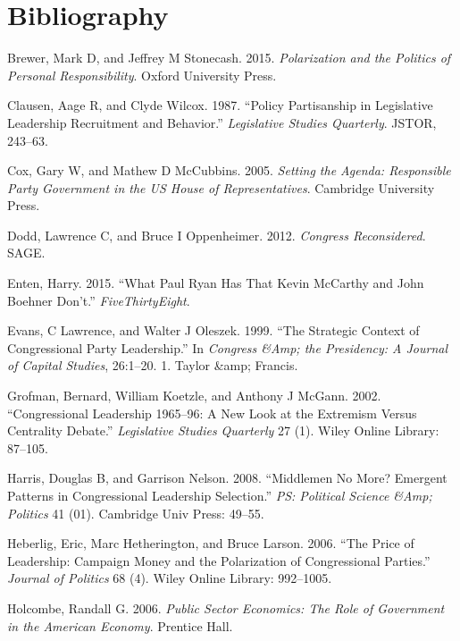 \documentclass[12pt,twoside]{reedthesis}
\begin{document}
  \backmatter
  
  \chapter{Bibliography}\label{bibliography}
  
  \noindent
  
  \setlength{\parindent}{-0.20in} \setlength{\leftskip}{0.20in}
  \setlength{\parskip}{8pt}
  
  Brewer, Mark D, and Jeffrey M Stonecash. 2015. \emph{Polarization and
  the Politics of Personal Responsibility}. Oxford University Press.
  
  Clausen, Aage R, and Clyde Wilcox. 1987. ``Policy Partisanship in
  Legislative Leadership Recruitment and Behavior.'' \emph{Legislative
  Studies Quarterly}. JSTOR, 243--63.
  
  Cox, Gary W, and Mathew D McCubbins. 2005. \emph{Setting the Agenda:
  Responsible Party Government in the US House of Representatives}.
  Cambridge University Press.
  
  Dodd, Lawrence C, and Bruce I Oppenheimer. 2012. \emph{Congress
  Reconsidered}. SAGE.
  
  Enten, Harry. 2015. ``What Paul Ryan Has That Kevin McCarthy and John
  Boehner Don't.'' \emph{FiveThirtyEight}.
  
  Evans, C Lawrence, and Walter J Oleszek. 1999. ``The Strategic Context
  of Congressional Party Leadership.'' In \emph{Congress \&Amp; the
  Presidency: A Journal of Capital Studies}, 26:1--20. 1. Taylor \&amp;
  Francis.
  
  Grofman, Bernard, William Koetzle, and Anthony J McGann. 2002.
  ``Congressional Leadership 1965--96: A New Look at the Extremism Versus
  Centrality Debate.'' \emph{Legislative Studies Quarterly} 27 (1). Wiley
  Online Library: 87--105.
  
  Harris, Douglas B, and Garrison Nelson. 2008. ``Middlemen No More?
  Emergent Patterns in Congressional Leadership Selection.'' \emph{PS:
  Political Science \&Amp; Politics} 41 (01). Cambridge Univ Press:
  49--55.
  
  Heberlig, Eric, Marc Hetherington, and Bruce Larson. 2006. ``The Price
  of Leadership: Campaign Money and the Polarization of Congressional
  Parties.'' \emph{Journal of Politics} 68 (4). Wiley Online Library:
  992--1005.
  
  Holcombe, Randall G. 2006. \emph{Public Sector Economics: The Role of
  Government in the American Economy}. Prentice Hall.
  
\end{document}
